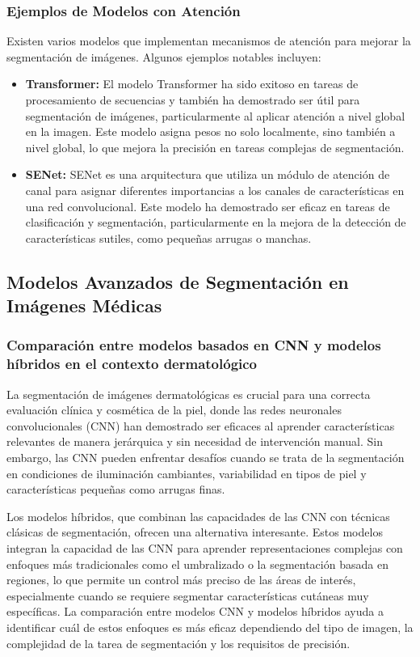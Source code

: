 \subsubsection{Ejemplos de Modelos con Atención}  
Existen varios modelos que implementan mecanismos de atención para mejorar la segmentación de imágenes. Algunos ejemplos notables incluyen:
\begin{itemize}
    \item \textbf{Transformer:} El modelo Transformer ha sido exitoso en tareas de procesamiento de secuencias y también ha demostrado ser útil para segmentación de imágenes, particularmente al aplicar atención a nivel global en la imagen. Este modelo asigna pesos no solo localmente, sino también a nivel global, lo que mejora la precisión en tareas complejas de segmentación. \parencite{autor2022transformer}
    \item \textbf{SENet:} SENet es una arquitectura que utiliza un módulo de atención de canal para asignar diferentes importancias a los canales de características en una red convolucional. Este modelo ha demostrado ser eficaz en tareas de clasificación y segmentación, particularmente en la mejora de la detección de características sutiles, como pequeñas arrugas o manchas. \parencite{autor2022cnn}
\end{itemize}


\subsection{Modelos Avanzados de Segmentación en Imágenes Médicas}
%
\subsubsection{Comparación entre modelos basados en CNN y modelos híbridos en el contexto dermatológico}
La segmentación de imágenes dermatológicas es crucial para una correcta evaluación clínica y cosmética de la piel, donde las redes neuronales convolucionales (CNN) han demostrado ser eficaces al aprender características relevantes de manera jerárquica y sin necesidad de intervención manual. Sin embargo, las CNN pueden enfrentar desafíos cuando se trata de la segmentación en condiciones de iluminación cambiantes, variabilidad en tipos de piel y características pequeñas como arrugas finas.

Los modelos híbridos, que combinan las capacidades de las CNN con técnicas clásicas de segmentación, ofrecen una alternativa interesante. Estos modelos integran la capacidad de las CNN para aprender representaciones complejas con enfoques más tradicionales como el umbralizado o la segmentación basada en regiones, lo que permite un control más preciso de las áreas de interés, especialmente cuando se requiere segmentar características cutáneas muy específicas. La comparación entre modelos CNN y modelos híbridos ayuda a identificar cuál de estos enfoques es más eficaz dependiendo del tipo de imagen, la complejidad de la tarea de segmentación y los requisitos de precisión.

